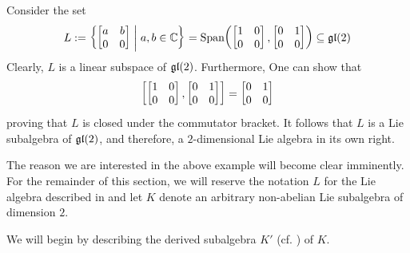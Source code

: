 \begin{boxexample}\label{Ch1:Eg:2D_NonAbelian_Lie_Algebra}
    Consider the set
    \begin{align*}
        L := \left\{ 
            \begin{bmatrix}
                a & b \\ 0 & 0
            \end{bmatrix}
         \; \middle\vert \; a, b \in \mathbb{C} \right\}
        = \operatorname{Span}\!\left( \begin{bmatrix} 1 & 0 \\ 0 & 0 \end{bmatrix}, \begin{bmatrix} 0 & 1 \\ 0 & 0 \end{bmatrix} \right)
        \subseteq \mathfrak{gl}\!\left( 2 \right)
    \end{align*}
    Clearly, $L$ is a linear subspace of $\mathfrak{gl}\!\left( 2 \right)$. Furthermore, One can show that
    \begin{align*}
        \left[ 
            \begin{bmatrix} 1 & 0 \\ 0 & 0 \end{bmatrix}, \begin{bmatrix} 0 & 1 \\ 0 & 0 \end{bmatrix}
         \right] = \begin{bmatrix} 0 & 1 \\ 0 & 0 \end{bmatrix}
    \end{align*}
    proving that $L$ is closed under the commutator bracket. It follows that $L$ is a Lie subalgebra of $\mathfrak{gl}\!\left( 2 \right)$, and therefore, a $2$-dimensional Lie algebra in its own right.
\end{boxexample}

The reason we are interested in the above example will become clear imminently. For the remainder of this section, we will reserve the notation $L$ for the Lie algebra described in  and let $K$ denote an arbitrary non-abelian Lie subalgebra of dimension $2$.

We will begin by describing the derived subalgebra $K'$ (cf. ) of $K$.

